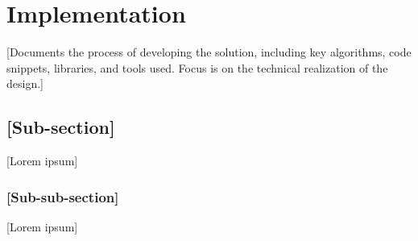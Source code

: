\chapter{Implementation}
\label{chap:implementation}

[Documents the process of developing the solution, including key algorithms, code snippets, libraries, and tools used. Focus is on the technical realization of the design.]

\section{[Sub-section]}
\label{sec:implementation_subsection}
[Lorem ipsum]

\subsection{[Sub-sub-section]}
\label{subsec:implementation_subsubsection}
[Lorem ipsum]

